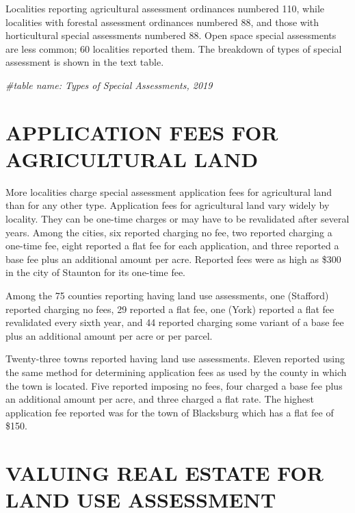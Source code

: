 \documentclass[
]{book}
\newenvironment{Shaded}{\begin{snugshade}}{\end{snugshade}}
\newcommand{\CommentTok}[1]{\textcolor[rgb]{0.56,0.35,0.01}{\textit{#1}}}
\begin{document}
Localities reporting agricultural assessment ordinances numbered 110, while localities with forestal assessment ordinances numbered 88, and those with horticultural special assessments numbered 88. Open space special assessments are less common; 60 localities reported them. The breakdown of types of special assessment is shown in the text table.

\begin{Shaded}
\begin{Highlighting}[]
\CommentTok{\#table name: Types of Special Assessments, 2019}
\end{Highlighting}
\end{Shaded}

\hypertarget{application-fees-for-agricultural-land}{%
\section{APPLICATION FEES FOR AGRICULTURAL LAND}\label{application-fees-for-agricultural-land}}

More localities charge special assessment application fees for agricultural land than for any other type. Application fees for agricultural land vary widely by locality. They can be one-time charges or may have to be revalidated after several years. Among the cities, six reported charging no fee, two reported charging a one-time fee, eight reported a flat fee for each application, and three reported a base fee plus an additional amount per acre. Reported fees were as high as \$300 in the city of Staunton for its one-time fee.

Among the 75 counties reporting having land use assessments, one (Stafford) reported charging no fees, 29 reported a flat fee, one (York) reported a flat fee revalidated every sixth year, and 44 reported charging some variant of a base fee plus an additional amount per acre or per parcel.

Twenty-three towns reported having land use assessments. Eleven reported using the same method for determining application fees as used by the county in which the town is located. Five reported imposing no fees, four charged a base fee plus an additional amount per acre, and three charged a flat rate. The highest application fee reported was for the town of Blacksburg which has a flat fee of \$150.

\hypertarget{valuing-real-estate-for-land-use-assessment}{%
\section{VALUING REAL ESTATE FOR LAND USE ASSESSMENT}\label{valuing-real-estate-for-land-use-assessment}}
\end{document}
